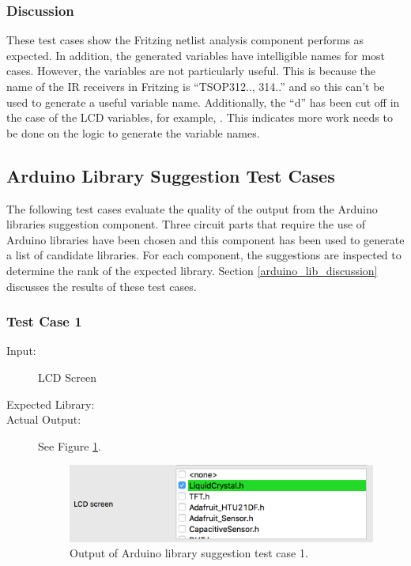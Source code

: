 \documentclass{UoYCSproject}
\begin{document}
\subsubsection{Discussion} \label{fritzing_analysis_discussion}
These test cases show the Fritzing netlist analysis component performs as expected. In addition, the generated variables have intelligible names for most cases. However, the variables  are not particularly useful. This is because the name of the IR receivers in Fritzing is ``TSOP312.., 314..'' and so this can't be used to generate a useful variable name. Additionally, the ``d'' has been cut off in the case of the LCD variables, for example, . This indicates more work needs to be done on the logic to generate the variable names. 

\subsection{Arduino Library Suggestion Test Cases}
The following test cases evaluate the quality of the output from the Arduino libraries suggestion component. Three circuit parts that require the use of Arduino libraries have been chosen and this component has been used to generate a list of candidate libraries. For each component, the suggestions are inspected to determine the rank of the expected library. Section \ref{arduino_lib_discussion} discusses the results of these test cases.

\subsubsection{Test Case 1}
\begin{description}
\item[Input:] LCD Screen
\item[Expected Library:] 
\item[Actual Output:] See Figure \ref{fig:lib_suggest_lcd}.
\begin{figure}[h!]
  \centering
  \includegraphics[width=0.5\linewidth]{graphics/lib_suggest_lcd.png}
  \caption{Output of Arduino library suggestion test case 1.}
  \label{fig:lib_suggest_lcd}
\end{figure}
\end{description}
\end{document}

